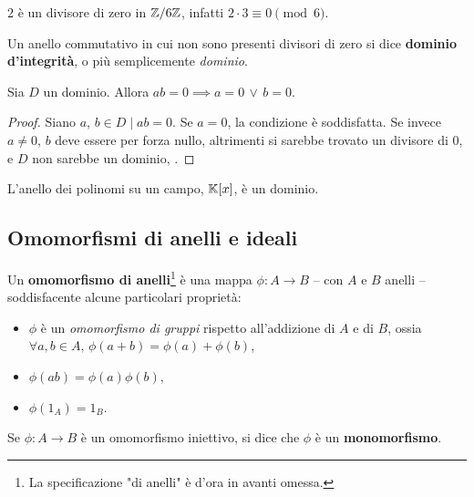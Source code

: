 \begin{example}
    $2$ è un divisore di zero in $\mathbb Z/6\mathbb Z$, infatti $2 \cdot 3 \equiv 0 \pmod 6.$
\end{example}

\begin{definition}
    Un anello commutativo in cui non sono presenti divisori di zero si dice \textbf{dominio d'integrità},
    o più semplicemente \textit{dominio}.
\end{definition}

\begin{proposition}
    Sia $D$ un dominio. Allora $ab=0 \implies a=0 \,\lor\, b=0$.
\end{proposition}

\begin{proof}
    Siano $a$, $b \in D \mid ab = 0$. Se $a=0$, la condizione è soddisfatta.
    Se invece $a \neq 0$, $b$ deve essere per forza nullo, altrimenti si
    sarebbe trovato un divisore di $0$, e $D$ non sarebbe un dominio, \Lightning.
\end{proof}

\begin{example}
    L'anello dei polinomi su un campo, $\mathbb{K}[x]$, è un dominio.
\end{example}

\subsection{Omomorfismi di anelli e ideali}

\begin{definition}
    Un \textbf{omomorfismo di anelli}\footnote{La specificazione "di anelli" è d'ora in avanti omessa.} è una mappa $\phi : A \to B$ -- con
    $A$ e $B$ anelli -- soddisfacente alcune particolari proprietà:

    \begin{itemize}
        \item $\phi$ è un \textit{omomorfismo di gruppi} rispetto all'addizione
              di $A$ e di $B$, ossia $\forall a, b \in A, \, \phi(a+b)=\phi(a)+\phi(b)$,
        \item $\phi(ab)=\phi(a)\phi(b)$,
        \item $\phi(1_A)=1_B$.
    \end{itemize}
\end{definition}

\begin{definition}
    Se $\phi : A \to B$ è un omomorfismo iniettivo, si dice che
    $\phi$ è un \textbf{monomorfismo}.
\end{definition}

